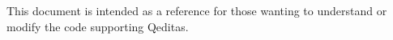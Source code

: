 This document is intended as a reference
for those wanting to understand or modify the
code supporting Qeditas.

